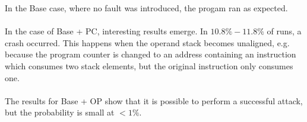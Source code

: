 In the Base case, where no fault was introduced, the progam ran as expected.\\\\
In the case of Base + PC, interesting results emerge. In $10.8\% - 11.8\%$ of runs, a crash occurred. This happens when the operand stack becomes unaligned, e.g. because the program counter is changed to an address containing an instruction which consumes two stack elements, but the original instruction only consumes one.\\\\
The results for Base + OP show that it is possible to perform a successful attack, but the probability is small at $< 1\%$.\\\\